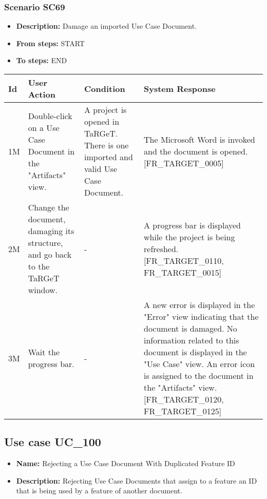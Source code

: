 \documentclass[a4paper,11pt]{article}
\newcommand{\bl}{\\ \hline}
\begin{document}
\subsubsection*{Scenario SC69}
\begin{itemize}
\item {\bf Description:} Damage an imported Use Case Document.
\item {\bf From steps:} START
\item {\bf To steps:} END
\end{itemize}
\begin{tabular}{|p{0.4in}|p{1.5in}|p{1.5in}|p{1.5in}|}
\hline
Id & User Action & Condition & System Response \bl 
1M & Double-click on a Use Case Document in the "Artifacts"
						view.  & A project is opened in TaRGeT. There is one imported and
						valid Use Case Document. & The Microsoft Word is invoked and the document is opened.
						[FR_TARGET_0005]\bl
2M & Change the document, damaging its structure, and go back to
						the TaRGeT window.  & - & A progress bar is displayed while the project is being
						refreshed. [FR_TARGET_0110, FR_TARGET_0015]\bl
3M & Wait the progress bar. & - & A new error is displayed in the "Error" view indicating
						that the document is damaged. No information related to this
						document is displayed in the "Use Case" view. An error icon is
						assigned to the document in the "Artifacts" view. [FR_TARGET_0120,
						FR_TARGET_0125] \bl
\end{tabular}
\subsection*{Use case UC_100}
\begin{itemize}
\item {\bf Name: }Rejecting a Use Case Document With Duplicated Feature ID
\item {\bf Description: }Rejecting Use Case Documents that assign to a feature an
				ID that is being used by a feature of another document.
			
\end{itemize}
\end{document}
